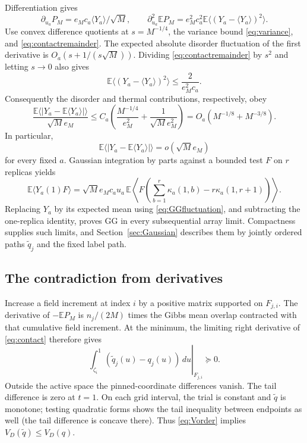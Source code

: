 \documentclass[11pt]{article}
\numberwithin{equation}{section}
\theoremstyle{definition}
\newcommand{\E}{\mathbb E}
\begin{document}
Differentiation gives
\[
\partial_{u_a}P_M=e_Mc_a\langle Y_a\rangle/\sqrt M,
\qquad
\partial_{u_a}^2\E P_M=e_M^2c_a^2\E\langle(Y_a-\langle Y_a\rangle)^2\rangle.
\]
Use convex difference quotients at $s=M^{-1/4}$, the variance bound \eqref{eq:variance}, and \eqref{eq:contactremainder}. The expected absolute disorder fluctuation of the first derivative is
$O_a(s+1/(s\sqrt M))$. Dividing \eqref{eq:contactremainder} by $s^2$ and letting $s\to0$ also gives
\[
\E\langle(Y_a-\langle Y_a\rangle)^2\rangle
\le\frac{2}{e_M^2c_a}.
\]
Consequently the disorder and thermal contributions, respectively, obey
\[
\frac{\E\langle|Y_a-\E\langle Y_a\rangle|\rangle}
 {\sqrt M e_M}
\le C_a\left(\frac{M^{-1/4}}{e_M^2}
+\frac1{\sqrt M e_M^2}\right)
=O_a(M^{-1/8}+M^{-3/8}).
\]
In particular,
\begin{equation}\label{eq:GGfluctuation}
\E\langle|Y_a-\E\langle Y_a\rangle|\rangle
=o(\sqrt M e_M)
\end{equation}
for every fixed $a$. Gaussian integration by parts against a bounded test $F$ on $r$ replicas yields
\[
\E\langle Y_a(1)F\rangle
=\sqrt M e_Mc_au_a\,\E\left\langle
F\left(\sum_{b=1}^r\kappa_a(1,b)-r\kappa_a(1,r+1)\right)\right\rangle.
\]
Replacing $Y_a$ by its expected mean using \eqref{eq:GGfluctuation}, and subtracting the one-replica identity, proves GG in every subsequential array limit. Compactness supplies such limits, and Section~\ref{sec:Gaussian} describes them by jointly ordered paths $\widetilde q_j$ and the fixed label path.

\subsection{The contradiction from derivatives}
Increase a field increment at index $i$ by a positive matrix supported on $F_{j,i}$. The derivative of $-\E P_M$ is $n_j/(2M)$ times the Gibbs mean overlap contracted with that cumulative field increment. At the minimum, the limiting right derivative of \eqref{eq:contact} therefore gives
\begin{equation}\label{eq:tailcontact}
\left.\int_{\zeta_i}^1(\widetilde q_j(u)-q_j(u))\,du\right|_{F_{j,i}}
\succeq0.
\end{equation}
Outside the active space the pinned-coordinate differences vanish. The tail difference is zero at $t=1$. On each grid interval, the trial is constant and $\widetilde q$ is monotone; testing quadratic forms shows the tail inequality between endpoints as well (the tail difference is concave there). Thus \eqref{eq:Vorder} implies $V_D(\widetilde q)\le V_D(q)$.
\end{document}
